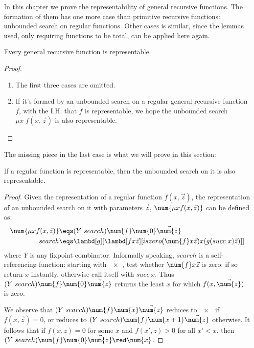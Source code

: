\documentclass[../../../include/open-logic-section]{subfiles}
\begin{document}

In this chapter we prove the representability of general recursive
functions. The formation of them has one more case than primitive
recursive functions: unbounded search on regular functions. Other
cases is similar, since the lemmas used, only requiring functions to be
total, can be applied here again. 
\begin{prop}
  Every general recursive function is representable.
\end{prop}
\begin{proof}
  \begin{enumerate}
  \item The first three cases are omitted.
  \item If it's formed by an unbounded search on a regular general
    recursive function $f$, with the I.H. that $f$ is representable,
    we hope the unbounded search $\mu x \; f(x, \vec z)$ is also
    representable. 
  \end{enumerate}
\end{proof}

The missing piece in the last case is what we will prove in this
section:

\begin{lem}
  If a regular function is representable, then the unbounded search on
  it is also representable.
\end{lem}
\begin{proof}
  Given the representation of a regular function $f(x,\vec z)$, the
  representation of an unbounded search on it with parameters $\vec
  z$, $\num{\mu x  f(x,\vec z)}$ can be defined as:
  \begin{align*}
    \num{\mu x  f(x,\vec{z})} &\eqs (Y ~ search) \num{f} \num{0}
                                 \vec{\num{z}} \\
    search &\eqs \lambd[g][\lambd[fx \vec{z}][iszero (\num{f} x \vec{z}) x (g (succ ~ x)
             \vec{z})]]
  \end{align*}
  where $Y$ is any fixpoint combinator. Informally speaking, $search$ is
  a self-referencing function: starting with $\num{x}$, test whether $\num{f} x
  \vec z$ is zero: if so return $x$ instantly, otherwise call itself
  with $succ ~ x$. Thus $(Y ~ search) \num{f} \num{0} \vec{\num{z}}$ returns
  the least $x$ for which $f(x,\vec{\num{z}})$ is zero.
  
  We observe that $(Y ~ search) \num{f} \num{x} \vec{\num{z}}$ reduces to $\num{x}$ if
  $f(x,\vec z)=0$, or reduces to $(Y ~ search) \num{f} \num{x+1} \vec{\num{z}}$
  otherwise. It follows that if $f(x,z) = 0$ for some $x$ and $f(x',z) > 0$ for all $x' < x$,
  then $(Y ~ search) \num{f} \num{0} \vec{\num{z}} \red \num{x}$.
\end{proof}
\end{document}
